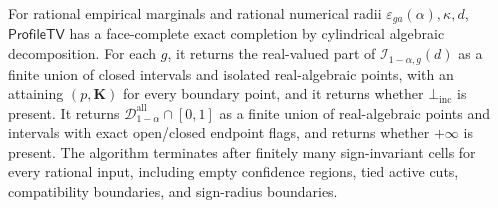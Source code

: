 For rational empirical marginals and rational numerical radii \(\varepsilon_{ga}(\alpha),\kappa,d\), \(\mathsf{ProfileTV}\) has a face-complete exact completion by cylindrical algebraic decomposition.  For each \(g\), it returns the real-valued part of \(\mathcal I_{1-\alpha,g}(d)\) as a finite union of closed intervals and isolated real-algebraic points, with an attaining \((p,\mathbf K)\) for every boundary point, and it returns whether \(\bot_{\mathrm{inc}}\) is present.  It returns \(\mathcal D_{1-\alpha}^{\mathrm{all}}\cap[0,1]\) as a finite union of real-algebraic points and intervals with exact open/closed endpoint flags, and returns whether \(+\infty\) is present.  The algorithm terminates after finitely many sign-invariant cells for every rational input, including empty confidence regions, tied active cuts, compatibility boundaries, and sign-radius boundaries.